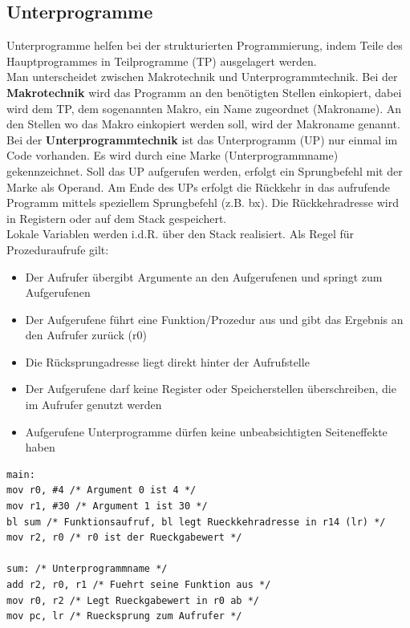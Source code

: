 \documentclass[a4paper,12pt,leqno]{article}
\begin{document}
\subsection{Unterprogramme}

Unterprogramme helfen bei der strukturierten Programmierung, indem Teile des Hauptprogrammes in Teilprogramme (TP) ausgelagert werden.\\
Man unterscheidet zwischen Makrotechnik und Unterprogrammtechnik.
Bei der \textbf{Makrotechnik} wird das Programm an den benötigten Stellen einkopiert, dabei wird dem TP, dem sogenannten Makro, ein Name zugeordnet (Makroname). An den Stellen wo das Makro einkopiert werden soll, wird der Makroname genannt.\\
Bei der \textbf{Unterprogrammtechnik} ist das Unterprogramm (UP) nur einmal im Code vorhanden. Es wird durch eine Marke (Unterprogrammname) gekennzeichnet. Soll das UP aufgerufen werden, erfolgt ein Sprungbefehl mit der Marke als Operand.
Am Ende des UPs erfolgt die Rückkehr in das aufrufende Programm mittels speziellem Sprungbefehl (z.B. bx). Die Rückkehradresse wird in Registern oder auf dem Stack gespeichert.\\

Lokale Variablen werden i.d.R. über den Stack realisiert.
Als Regel für Prozeduraufrufe gilt:
\begin{itemize}
\item Der Aufrufer übergibt Argumente an den Aufgerufenen und springt zum Aufgerufenen
\item Der Aufgerufene führt eine Funktion/Prozedur aus und gibt das Ergebnis an den Aufrufer zurück (r0)
\item Die Rücksprungadresse liegt direkt hinter der Aufrufstelle
\item Der Aufgerufene darf keine Register oder Speicherstellen überschreiben, die im Aufrufer genutzt werden
\item Aufgerufene Unterprogramme dürfen keine unbeabsichtigten Seiteneffekte haben
\end{itemize}

\begin{lstlisting}
main:
mov r0, #4 /* Argument 0 ist 4 */
mov r1, #30 /* Argument 1 ist 30 */
bl sum /* Funktionsaufruf, bl legt Rueckkehradresse in r14 (lr) */
mov r2, r0 /* r0 ist der Rueckgabewert */

sum: /* Unterprogrammname */
add r2, r0, r1 /* Fuehrt seine Funktion aus */
mov r0, r2 /* Legt Rueckgabewert in r0 ab */
mov pc, lr /* Ruecksprung zum Aufrufer */
\end{lstlisting}
\end{document}
